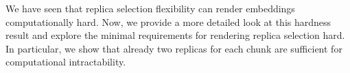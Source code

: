We have seen that replica selection flexibility can render embeddings computationally hard.
Now, we provide a more detailed look at this hardness result
and explore the minimal requirements for rendering replica selection hard.
In particular, we show that already two replicas for each chunk are sufficient for computational intractability.

%
%
%
